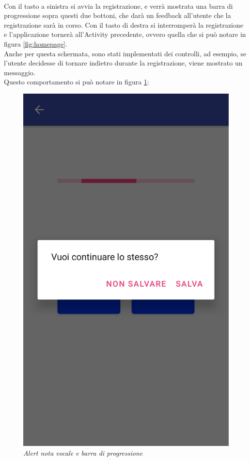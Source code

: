 \\Con il tasto a sinistra si avvia la registrazione, e verrà mostrata una barra di progressione sopra questi due bottoni, che darà un feedback all'utente che la registrazione sarà in corso. Con il tasto di destra si interromperà la registrazione e l'applicazione tornerà all'Activity precedente, ovvero quella che si può notare in figura \ref{fig:homepage}.
\\Anche per questa schermata, sono stati implementati dei controlli, ad esempio, se l'utente decidesse di tornare indietro durante la registrazione, viene mostrato un messaggio.
\\Questo comportamento si può notare in figura \ref{fig:alertvocale}:
\begin{figure}[!h]
    \centering
	\includegraphics[scale=0.14]{Tesi/images/AlertVocale}
	\caption{\textit{Alert nota vocale e barra di progressione}}
	\label{fig:alertvocale}
\end{figure}

